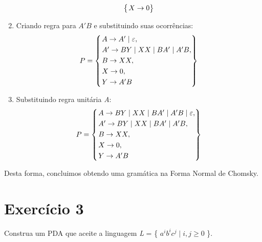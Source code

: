 \documentclass[11pt,portuguese]{fphw}
\begin{document}
\begin{enumerate}
$$\begin{dcases}
\begin{rcases}
							X \rightarrow 0
							\end{rcases}
						\end{dcases}
						$$
					\item Criando regra para \begin{math}A'B\end{math} e substituindo
					suas ocorrências:
						$$
						P = \begin{dcases}
						\begin{rcases}
							A \rightarrow A' \mid \varepsilon,\\
							A' \rightarrow BY \mid XX 
							 \mid BA' \mid A'B,\\
							B \rightarrow XX,\\
							X \rightarrow 0,\\
							Y \rightarrow A'B
							\end{rcases}
						\end{dcases}
						$$
					\item Substituindo regra unitária \textit{A}:
						$$
						P = \begin{dcases}
						\begin{rcases}
							A \rightarrow BY \mid XX 
							 \mid BA' \mid A'B \mid \varepsilon,\\
							A' \rightarrow BY \mid XX 
							 \mid BA' \mid A'B,\\
							B \rightarrow XX,\\
							X \rightarrow 0,\\
							Y \rightarrow A'B
							\end{rcases}
						\end{dcases}
						$$
				\end{enumerate}
				Desta forma, concluimos obtendo uma gramática na Forma Normal de Chomsky.
					
				\section*{Exercício 3}
					\begin{problem}
						Construa um PDA que aceite a linguagem \textit{L} = \{
						\begin{math}
							a^i b^i c^j \mid i,j \geq 0
						\end{math}
						\}.
					\end{problem}
\end{document}
